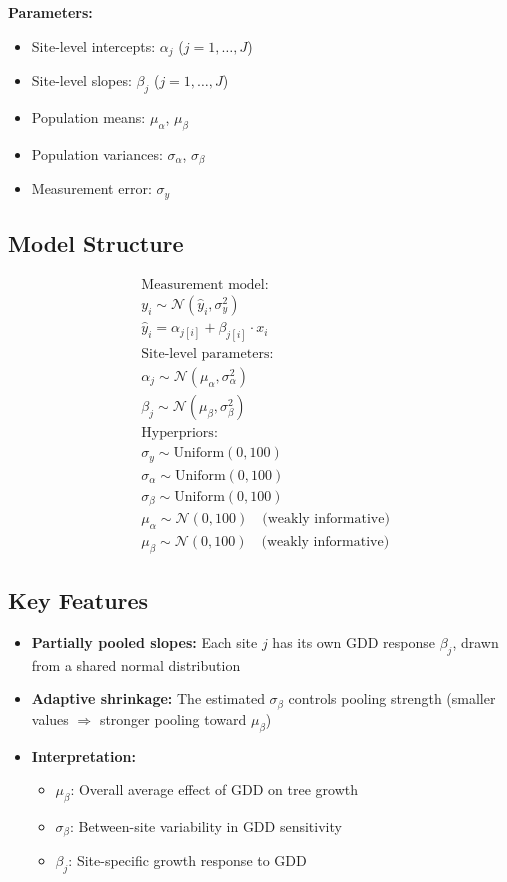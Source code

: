 \documentclass[a4paper,12pt]{article}
\begin{document}
\textbf{Parameters:}
\begin{itemize}
    \item Site-level intercepts: $\alpha_j$ ($j = 1, \dots, J$)
    \item Site-level slopes: $\beta_j$ ($j = 1, \dots, J$)
    \item Population means: $\mu_\alpha$, $\mu_\beta$
    \item Population variances: $\sigma_\alpha$, $\sigma_\beta$
    \item Measurement error: $\sigma_y$
\end{itemize}

\subsection*{Model Structure}

\begin{align*}
&\text{Measurement model:} \\
&y_i \sim \mathcal{N}(\hat{y}_i, \sigma_y^2) \\
&\hat{y}_i = \alpha_{j[i]} + \beta_{j[i]} \cdot x_i \\[2ex]
%
&\text{Site-level parameters:} \\
&\alpha_j \sim \mathcal{N}(\mu_\alpha, \sigma_\alpha^2) \\
&\beta_j \sim \mathcal{N}(\mu_\beta, \sigma_\beta^2) \\[2ex]
%
&\text{Hyperpriors:} \\
&\sigma_y \sim \text{Uniform}(0, 100) \\
&\sigma_\alpha \sim \text{Uniform}(0, 100) \\
&\sigma_\beta \sim \text{Uniform}(0, 100) \\
&\mu_\alpha \sim \mathcal{N}(0, 100) \quad \text{(weakly informative)} \\
&\mu_\beta \sim \mathcal{N}(0, 100) \quad \text{(weakly informative)}
\end{align*}

\subsection*{Key Features}

\begin{itemize}
    \item \textbf{Partially pooled slopes:} Each site $j$ has its own GDD response $\beta_j$, drawn from a shared normal distribution
    \item \textbf{Adaptive shrinkage:} The estimated $\sigma_\beta$ controls pooling strength (smaller values $\Rightarrow$ stronger pooling toward $\mu_\beta$)
    \item \textbf{Interpretation:}
    \begin{itemize}
        \item $\mu_\beta$: Overall average effect of GDD on tree growth
        \item $\sigma_\beta$: Between-site variability in GDD sensitivity
        \item $\beta_j$: Site-specific growth response to GDD
    \end{itemize}
\end{itemize}
\end{document}

